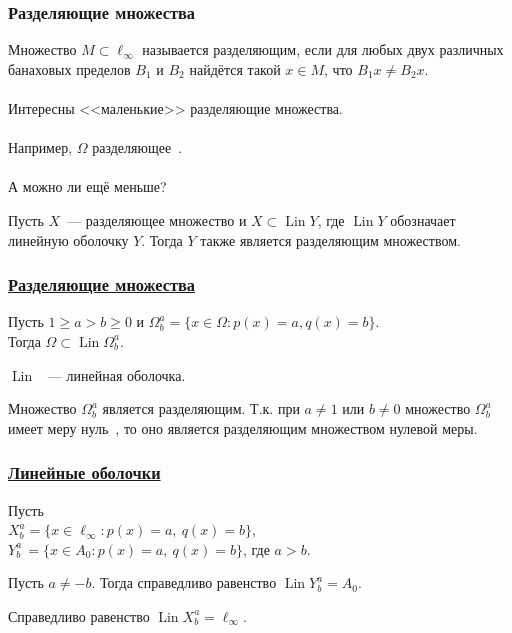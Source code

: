 \begin{frame}\frametitle{Разделяющие множества}
	Множество $M\subset \ell_\infty$ называется разделяющим,
	если для любых двух различных банаховых пределов $B_1$ и $B_2$
	найдётся такой $x\in M$, что $B_1 x \ne B_2 x$.
	\\~\\
	Интересны <<маленькие>> разделяющие множества.
	\\~\\
	Например, $\Omega$ разделяющее~\cite{semenov2010characteristic}.
	\\~\\
	А можно ли ещё меньше?
	\vfill
	\begin{llemma}
		Пусть $X$~--- разделяющее множество и $X \subset \operatorname{Lin} Y$,
		где $\operatorname{Lin} Y$ обозначает линейную оболочку $Y$.
		Тогда $Y$ также является разделяющим множеством.
	\end{llemma}
\end{frame}


\begin{frame}\frametitle{\underline{Разделяющие множества}}

	\begin{ttheorem}
		Пусть
		$1 \geq a > b \geq 0$ и
		$\Omega^a_b = \{x\in\Omega : p(x) = a, q(x) = b\}$.
		\\
		Тогда $\Omega \subset \operatorname{Lin} \Omega^a_b$.
	\end{ttheorem}

	\vfill
	$\operatorname{Lin}$ ~--- линейная оболочка.
	\vfill
	\begin{ttheorem}
		Множество $\Omega^a_b$ является разделяющим.
		Т.к. при $a\neq 1$ или $b\neq 0$ множество $\Omega^a_b$ имеет меру нуль~\cite{semenov2010characteristic,connor1990almost},
		то оно является разделяющим множеством нулевой меры.
	\end{ttheorem}
\end{frame}


\begin{frame}\frametitle{\underline{Линейные оболочки}}

	Пусть
	\\
	$X^a_b = \{x\in\ell_\infty : p(x) = a,~ q(x) = b\}$,
	\\
	$Y^a_b\, = \{x\in A_0 : p(x) = a,~ q(x) = b\}$, где $a>b$.
	\vfill
	\begin{ttheorem}
		Пусть $a\neq -b$.
		Тогда справедливо равенство $\operatorname{Lin} Y^a_b = A_0$.
	\end{ttheorem}
	\vfill
	\begin{ttheorem}
		Справедливо равенство $\operatorname{Lin} X^a_b = \ell_\infty$.
	\end{ttheorem}

\end{frame}



